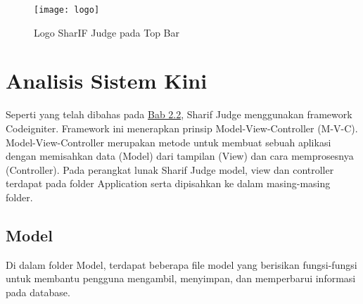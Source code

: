 \begin{figure}[H]
	\centering  
	\texttt{[image: logo]}  
	\caption[Logo SharIF Judge pada Top Bar]{Logo SharIF Judge pada Top Bar} 
	\label{fig:logo} 
\end{figure} 

\pagebreak

\section{Analisis Sistem Kini}

Seperti yang telah dibahas pada \hyperref[sec:sharifjudge]{Bab 2.2}, Sharif Judge menggunakan framework Codeigniter. Framework ini menerapkan prinsip Model-View-Controller (M-V-C). Model-View-Controller merupakan metode untuk membuat sebuah aplikasi dengan memisahkan data (Model) dari tampilan (View) dan cara memprosesnya (Controller). Pada perangkat lunak Sharif Judge model, view dan controller terdapat pada folder Application serta dipisahkan ke dalam masing-masing folder.  

\subsection{Model}
Di dalam folder {Model}, terdapat beberapa file model yang berisikan fungsi-fungsi untuk membantu pengguna mengambil, menyimpan, dan memperbarui informasi pada database.

